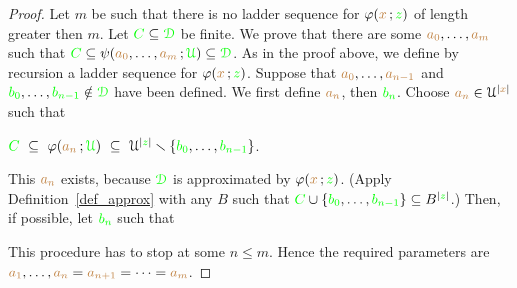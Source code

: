 \documentclass[creche.tex]{subfiles}
\begin{document}
\begin{proof}
Let $m$ be such that there is no ladder sequence for $\varphi({\color{brown} x}\,;{\color{green} z})$ of length greater then $m$.
Let ${\color{green} C}\subseteq{\color{green}\EuScript D}$ be finite.
We prove that there are some ${\color{brown} a_0},\dots,{\color{brown} a_m}$ such that ${\color{green} C}\subseteq\psi({\color{brown} a_0},\dots,{\color{brown} a_m}\,;{\color{green}\EuScript U})\subseteq{\color{green}\EuScript D}$.
As in the proof above, we define by recursion a ladder sequence for $\varphi({\color{brown} x}\,;{\color{green} z})$.
Suppose that ${\color{brown} a_0},\dots,{\color{brown} a_{n-1}}$ and ${\color{green} b_0},\dots,{\color{green} b_{n-1}}\notin{\color{green}\EuScript D}$ have been defined.
We first define ${\color{brown} a_n}$, then ${\color{green} b_n}$. 
Choose ${\color{brown} a_n}\in\EuScript U^{|{\color{brown} x}|}$ such that 

\hfil${\color{green} C}\ \subseteq\ \varphi({\color{brown} a_n}\,;{\color{green}\EuScript U})\ \subseteq\ \EuScript U^{|{\color{green} z}|}\smallsetminus\{{\color{green} b_0},\dots,{\color{green} b_{n-1}}\}$.

This ${\color{brown} a_n}$ exists, because ${\color{green}\EuScript D}$ is approximated by $\varphi({\color{brown} x}\,;{\color{green} z})$.
(Apply Definition~\ref{def_approx} with any $B$ such that ${\color{green} C}\cup\{{\color{green} b_0},\dots,{\color{green} b_{n-1}}\}\subseteq B^{|{\color{green} z}|}$.)
Then, if possible, let ${\color{green} b_n}$ such that


This procedure has to stop at some $n\le m$.
Hence the required parameters are ${\color{brown} a_1},\dots,{\color{brown} a_n}={\color{brown} a_{n+1}}=\dots={\color{brown} a_{m}}$.
\end{proof}




\end{document}
